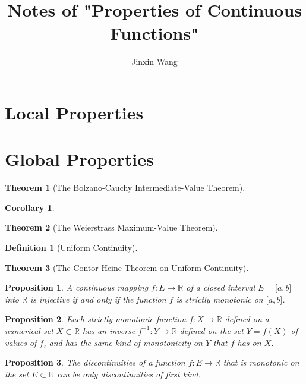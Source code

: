 \documentclass[onecolumn]{ctexart}
\title{Notes of "Properties of Continuous Functions"}
\author{Jinxin Wang}
\date{}
\newtheorem{definition}{Definition}
\newtheorem{theorem}{Theorem}
\newtheorem{proposition}{Proposition}
\newtheorem{corollary}{Corollary}
\begin{document}
\maketitle

\section{Local Properties}

\section{Global Properties}

\begin{theorem}[The Bolzano-Cauchy Intermediate-Value Theorem]
  
\end{theorem}

\begin{corollary}
  
\end{corollary}

\begin{theorem}[The Weierstrass Maximum-Value Theorem]
  
\end{theorem}

\begin{definition}[Uniform Continuity]
  
\end{definition}

\begin{theorem}[The Contor-Heine Theorem on Uniform Continuity]
  
\end{theorem}

\begin{proposition}
  A continuous mapping $f:E \to \mathbb{R}$ of a closed interval 
  $E = \lbrack a,b \rbrack$ into $\mathbb{R}$ is injective if and only if the 
  function $f$ is strictly monotonic on $\lbrack a,b \rbrack$.
\end{proposition}

\begin{proposition}
  Each strictly monotonic function $f:X \to \mathbb{R}$ defined on a numerical 
  set $X \subset \mathbb{R}$ has an inverse $f^{-1}:Y \to \mathbb{R}$ defined on 
  the set $Y = f(X)$ of values of $f$, and has the same kind of monotonicity on 
  $Y$ that $f$ has on $X$.
\end{proposition}

\begin{proposition}
  The discontinuities of a function $f:E \to \mathbb{R}$ that is monotonic on 
  the set $E \subset \mathbb{R}$ can be only discontinuities of first kind.
\end{proposition}
\end{document}
